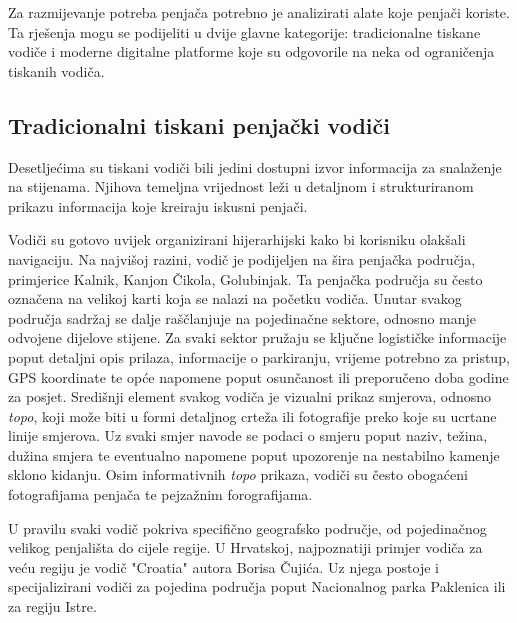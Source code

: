 
Za razmijevanje potreba penjača potrebno je analizirati alate koje penjači koriste. Ta rješenja mogu se podijeliti u dvije glavne kategorije: tradicionalne tiskane vodiče i moderne digitalne platforme koje su odgovorile na neka od ograničenja tiskanih vodiča.

\subsection{Tradicionalni tiskani penjački vodiči}

Desetljećima su tiskani vodiči bili jedini dostupni izvor informacija za snalaženje na stijenama. Njihova temeljna vrijednost leži u detaljnom i strukturiranom prikazu informacija koje kreiraju iskusni penjači. 

Vodiči su gotovo uvijek organizirani hijerarhijski kako bi korisniku olakšali navigaciju. Na najvišoj razini, vodič je podijeljen na šira penjačka područja, primjerice Kalnik, Kanjon Čikola, Golubinjak. Ta penjačka područja su često označena na velikoj karti koja se nalazi na početku vodiča. Unutar svakog područja sadržaj se dalje raščlanjuje na pojedinačne sektore, odnosno manje odvojene dijelove stijene. Za svaki sektor pružaju se ključne logističke informacije poput detaljni opis prilaza, informacije o parkiranju, vrijeme potrebno za pristup, GPS koordinate te opće napomene poput osunčanost ili preporučeno doba godine za posjet. 
Središnji element svakog vodiča je vizualni prikaz smjerova, odnosno \textit{topo}, koji može biti u formi detaljnog crteža ili fotografije preko koje su ucrtane linije smjerova. Uz svaki smjer navode se podaci o smjeru poput naziv, težina, dužina smjera te eventualno napomene poput upozorenje na nestabilno kamenje sklono kidanju. Osim informativnih \textit{topo} prikaza, vodiči su često obogaćeni fotografijama penjača te pejzažnim forografijama. 


U pravilu svaki vodič pokriva specifično geografsko područje, od pojedinačnog velikog penjališta do cijele regije. U Hrvatskoj, najpoznatiji primjer vodiča za veću regiju je vodič "Croatia" autora Borisa Čujića. Uz njega postoje i specijalizirani vodiči za pojedina područja poput Nacionalnog parka Paklenica ili za regiju Istre.

